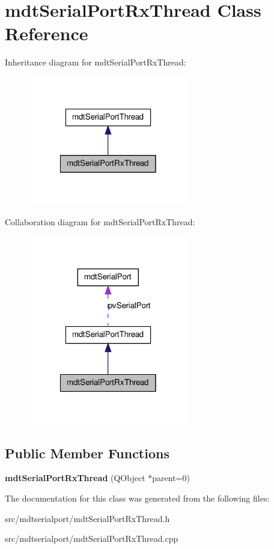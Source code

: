 \hypertarget{classmdt_serial_port_rx_thread}{
\section{mdtSerialPortRxThread Class Reference}
\label{classmdt_serial_port_rx_thread}
}


Inheritance diagram for mdtSerialPortRxThread:\nopagebreak
\begin{figure}[H]
\begin{center}
\leavevmode
\includegraphics[width=198pt]{classmdt_serial_port_rx_thread__inherit__graph}
\end{center}
\end{figure}


Collaboration diagram for mdtSerialPortRxThread:\nopagebreak
\begin{figure}[H]
\begin{center}
\leavevmode
\includegraphics[width=198pt]{classmdt_serial_port_rx_thread__coll__graph}
\end{center}
\end{figure}
\subsection*{Public Member Functions}
\begin{DoxyCompactItemize}
\item 
\hypertarget{classmdt_serial_port_rx_thread_a2eb954fc232134b60eee7ba3919ccc6d}{
{\bfseries mdtSerialPortRxThread} (QObject $\ast$parent=0)}
\label{classmdt_serial_port_rx_thread_a2eb954fc232134b60eee7ba3919ccc6d}

\end{DoxyCompactItemize}


The documentation for this class was generated from the following files:\begin{DoxyCompactItemize}
\item 
src/mdtserialport/mdtSerialPortRxThread.h\item 
src/mdtserialport/mdtSerialPortRxThread.cpp\end{DoxyCompactItemize}
